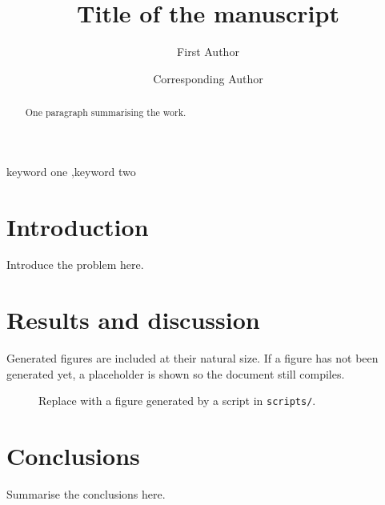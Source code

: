 \documentclass[preprint, 12pt]{elsarticle}
\begin{document}
\begin{frontmatter}

\title{Title of the manuscript}

\author[a]{First Author}
\author[a]{Corresponding Author}

\begin{abstract}
  One paragraph summarising the work.
\end{abstract}

\begin{keyword}
  keyword one \sep keyword two
\end{keyword}

\end{frontmatter}

\section{Introduction}

Introduce the problem here.

\section{Results and discussion}

Generated figures are included at their natural size. If a figure has not been generated
yet, a placeholder is shown so the document still compiles.

\begin{figure}[htbp]
  \centering
  \caption{Replace with a figure generated by a script in \texttt{scripts/}.}
  \label{fig:example}
\end{figure}

\section{Conclusions}

Summarise the conclusions here.



\end{document}
